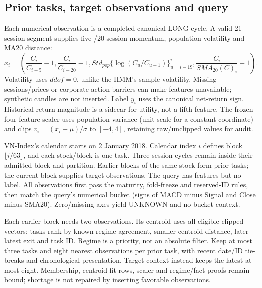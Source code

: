 \subsection{Prior tasks, target observations and query}\label{s:673616bb765d15ae}
Each numerical observation is a completed canonical LONG cycle. A valid
21-session segment supplies five-/20-session momentum, population
volatility and MA20 distance:
\begin{equation}
x_i=\left(\frac{C_i}{C_{i-5}}-1,\frac{C_i}{C_{i-20}}-1,
Std_{pop}\{\log(C_u/C_{u-1})\}_{u=i-19}^{i},
\frac{C_i}{SMA_{20}(C)_i}-1\right).
\end{equation}
Volatility uses $ddof=0$, unlike the HMM's sample volatility. Missing
sessions/prices or corporate-action barriers can make features
unavailable; synthetic candles are not inserted. Label $y_i$ uses the
canonical net-return sign. Historical return magnitude is a sidecar for
utility, not a fifth feature. The frozen four-feature scaler uses
population variance (unit scale for a constant coordinate) and clips
$v_i=(x_i-\mu)/\sigma$ to $[-4,4]$, retaining raw/unclipped values for audit.

VN-Index's calendar starts on 2 January 2018. Calendar index $i$ defines
block $\lfloor i/63\rfloor$, and each stock/block is one task. Three-session
cycles remain inside their admitted block and partition. Earlier blocks
of the same stock form prior tasks; the current block supplies target
observations. The query has features but no label. All observations first
pass the maturity, fold-freeze and reserved-ID rules, then match the
query's numerical bucket (signs of MACD minus Signal and Close minus
SMA20). Zero/missing axes yield UNKNOWN and no bucket context.

Each earlier block needs two observations. Its centroid uses all eligible
clipped vectors; tasks rank by known regime agreement, smaller centroid
distance, later latest exit and task ID. Regime is a priority, not an
absolute filter. Keep at most three tasks and eight nearest observations
per prior task, with recent date/ID tie-breaks and chronological
presentation. Target context instead keeps the latest at most eight.
Membership, centroid-fit rows, scaler and regime/fact proofs remain
bound; shortage is not repaired by inserting favorable observations.

